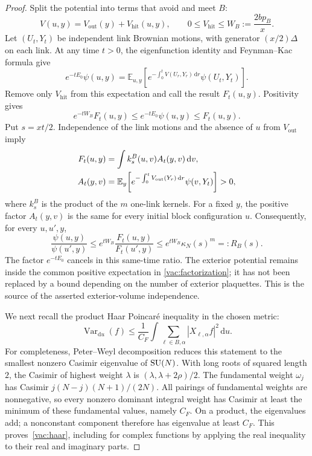 \begin{proof}
Split the potential into terms that avoid and meet $B$:
\begin{equation}
 V(u,y)=V_{\mathrm{out}}(y)+V_{\mathrm{hit}}(u,y),
 \qquad
 0\leq V_{\mathrm{hit}}\leq W_B:=\frac{2bp_B}{x}.
 \label{vac:split}
\end{equation}
Let $(U_t,Y_t)$ be independent link Brownian motions, with generator
$(x/2)\Delta$ on each link.  At any time $t>0$, the eigenfunction identity
and Feynman--Kac formula give
\begin{equation}
 e^{-tE_0}\psi(u,y)=
 \mathbb E_{u,y}\!\left[
 e^{-\int_0^t V(U_r,Y_r)\,\mathrm dr}\psi(U_t,Y_t)\right].
 \label{vac:fk}
\end{equation}
Remove only $V_{\mathrm{hit}}$ from this expectation and call the result
$F_t(u,y)$.  Positivity gives
\begin{equation}
 e^{-tW_B}F_t(u,y)\leq e^{-tE_0}\psi(u,y)\leq F_t(u,y).
 \label{vac:fksandwich}
\end{equation}
Put $s=xt/2$.  Independence of the link motions and the absence of $u$ from
$V_{\mathrm{out}}$ imply
\begin{align}
 F_t(u,y)&=\int k_s^B(u,v)A_t(y,v)\,\mathrm dv,
 \label{vac:factorization}\\
 A_t(y,v)&=\mathbb E_y\!\left[
       e^{-\int_0^t V_{\mathrm{out}}(Y_r)\,\mathrm dr}
       \psi(v,Y_t)\right]>0,
 \notag
\end{align}
where $k_s^B$ is the product of the $m$ one-link kernels.  For a fixed $y$,
the positive factor $A_t(y,v)$ is the same for every initial block
configuration $u$.  Consequently, for every $u,u',y$,
\begin{equation}
 \frac{\psi(u,y)}{\psi(u',y)}
 \leq e^{tW_B}\frac{F_t(u,y)}{F_t(u',y)}
 \leq e^{tW_B}\kappa_N(s)^m=:R_B(s).
 \label{vac:oscillation}
\end{equation}
The factor $e^{-tE_0}$ cancels in this same-time ratio.  The exterior
potential remains inside the common positive expectation in
\eqref{vac:factorization}; it has not been replaced by a bound depending on
the number of exterior plaquettes.  This is the source of the asserted
exterior-volume independence.

We next recall the product Haar Poincar\'e inequality in the chosen metric:
\begin{equation}
 \operatorname{Var}_{\mathrm du}(f)
 \leq\frac1{C_F}\int\sum_{\ell\in B,\alpha}
                 |X_{\ell,\alpha}f|^2\,\mathrm du.
 \label{vac:haar}
\end{equation}
For completeness, Peter--Weyl decomposition reduces this statement to the
smallest nonzero Casimir eigenvalue of $\operatorname{SU}(N)$.  With long roots of squared
length $2$, the Casimir of highest weight $\lambda$ is
$(\lambda,\lambda+2\rho)/2$.  The fundamental weight $\omega_j$ has Casimir
$j(N-j)(N+1)/(2N)$.  All pairings of fundamental weights are nonnegative,
so every nonzero dominant integral weight has Casimir at least the minimum
of these fundamental values, namely $C_F$.  On a product, the eigenvalues
add; a nonconstant component therefore has eigenvalue at least $C_F$.
This proves~\eqref{vac:haar}, including for complex functions by applying
the real inequality to their real and imaginary parts.


\end{proof}
